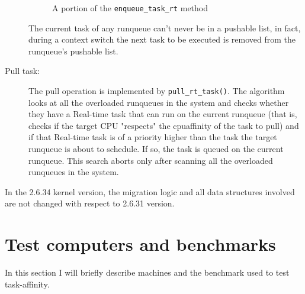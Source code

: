 \begin{description}
\begin{figure}[h]
  \lstset{basicstyle=\footnotesize, language=c, captionpos=b, frame=single, label=lis:steps}
  
  \label{code:ttwu}
  \caption{A portion of the \texttt{enqueue\_task\_rt} method}
\end{figure}

The current task of any runqueue can't never be in a pushable list, in fact, during a context switch the next task to be executed is removed from the 
runqueue's pushable list.

\item[Pull task:] The pull operation is implemented by \texttt{pull\_rt\_task()}. The algorithm looks at all the overloaded runqueues in the system 
and checks whether they have a Real-time task that can run on the current
runqueue (that is, checks if the target CPU "respects" the cpuaffinity of 
the task to pull) and if that Real-time task is of a priority higher than the task the target runqueue is about to schedule. If so, the task is 
queued on the current runqueue. This search aborts only after scanning all the overloaded runqueues in the system. 

\end{description}

In the 2.6.34 kernel version, the migration logic and all data structures involved are not changed with respect to 2.6.31 version.

\section{Test computers and benchmarks}

In this section I will briefly describe machines and the benchmark used to test task-affinity.

